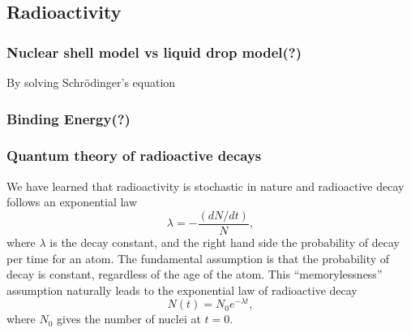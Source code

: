 \documentclass[preprint,aip,pra]{revtex4-1}
\begin{document}
    \subsection{Radioactivity}
    \subsubsection{Nuclear shell model vs liquid drop model(?)}
        By solving Schr\"{o}dinger's equation\cite{k88}
    \subsubsection{Binding Energy(?)}

        \subsubsection{Quantum theory of radioactive decays}
        We have learned that radioactivity is stochastic in nature and radioactive decay follows
        an exponential law
        \begin{equation} \label{eq:exp}
            \lambda = -\frac{(dN/dt)}{N},
        \end{equation}
        where $\lambda$ is the decay constant, and the right hand side the probability of decay
        per time for an atom. The fundamental assumption is that the probability of decay is constant,
        regardless of the age of the atom. This ``memorylessness'' assumption naturally leads to the
        exponential law of radioactive decay
        \begin{equation}
            N(t) = N_0 e^{-\lambda t},
        \end{equation}
        where $N_0$ gives the number of nuclei at $t=0$.
\end{document}
